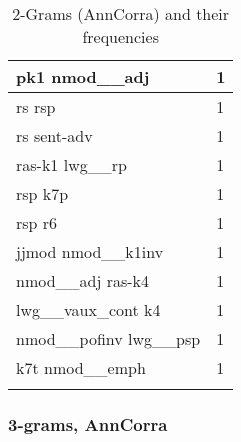 \documentclass[a4 paper]{article}
\begin{document}
\begin{longtable}{p{}p{}}
pk1 nmod\_\_adj  & 1 \\ \midrule
rs rsp  & 1 \\ \midrule
rs sent-adv  & 1 \\ \midrule
ras-k1 lwg\_\_rp  & 1 \\ \midrule
rsp k7p  & 1 \\ \midrule
rsp r6  & 1 \\ \midrule
jjmod nmod\_\_k1inv  & 1 \\ \midrule
nmod\_\_adj ras-k4  & 1 \\ \midrule
lwg\_\_vaux\_cont k4  & 1 \\ \midrule
nmod\_\_pofinv lwg\_\_psp  & 1 \\ \midrule
k7t nmod\_\_emph  & 1 \\ \midrule
    \caption{2-Grams (AnnCorra) and their frequencies}
\label{tab:ngram2ann}
\end{longtable}
    

\subsubsection{3-grams, AnnCorra}
\end{document}
